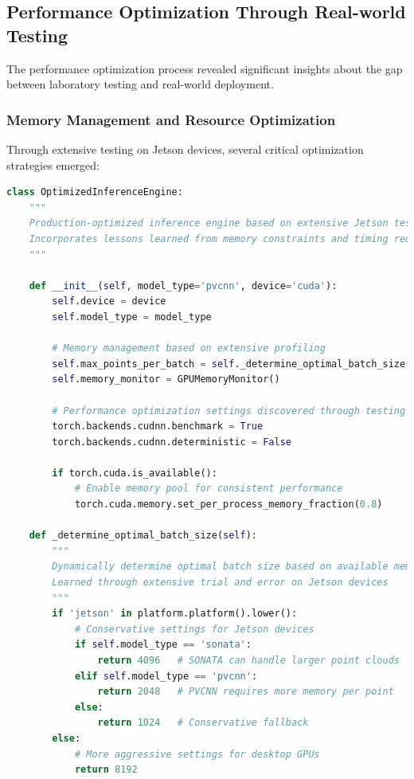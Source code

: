 \documentclass[12pt,a4paper]{report}
\begin{document}
\subsection{Performance Optimization Through Real-world Testing}

The performance optimization process revealed significant insights about the gap between laboratory testing and real-world deployment.

\subsubsection{Memory Management and Resource Optimization}

Through extensive testing on Jetson devices, several critical optimization strategies emerged:

\begin{lstlisting}[caption=Real-world Performance Optimization Strategies, label=lst:performance_optimization, language=python]
class OptimizedInferenceEngine:
    """
    Production-optimized inference engine based on extensive Jetson testing
    Incorporates lessons learned from memory constraints and timing requirements
    """
    
    def __init__(self, model_type='pvcnn', device='cuda'):
        self.device = device
        self.model_type = model_type
        
        # Memory management based on extensive profiling
        self.max_points_per_batch = self._determine_optimal_batch_size()
        self.memory_monitor = GPUMemoryMonitor()
        
        # Performance optimization settings discovered through testing
        torch.backends.cudnn.benchmark = True
        torch.backends.cudnn.deterministic = False
        
        if torch.cuda.is_available():
            # Enable memory pool for consistent performance
            torch.cuda.memory.set_per_process_memory_fraction(0.8)
    
    def _determine_optimal_batch_size(self):
        """
        Dynamically determine optimal batch size based on available memory
        Learned through extensive trial and error on Jetson devices
        """
        if 'jetson' in platform.platform().lower():
            # Conservative settings for Jetson devices
            if self.model_type == 'sonata':
                return 4096   # SONATA can handle larger point clouds
            elif self.model_type == 'pvcnn':
                return 2048   # PVCNN requires more memory per point
            else:
                return 1024   # Conservative fallback
        else:
            # More aggressive settings for desktop GPUs
            return 8192
    

\end{lstlisting}
\end{document}
